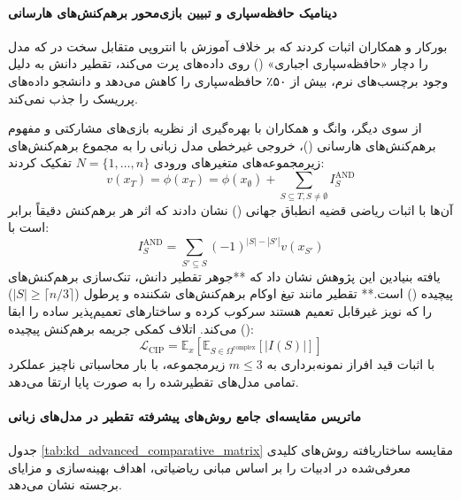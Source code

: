 \paragraph*{دینامیک حافظه‌سپاری و تبیین بازی‌محور برهم‌کنش‌های هارسانی}
بورکار و همکاران \cite{borkar2026memorization} اثبات کردند که بر خلاف آموزش با انتروپی متقابل سخت در  که مدل را دچار «حافظه‌سپاری اجباری» () روی داده‌های پرت می‌کند، تقطیر دانش به دلیل وجود برچسب‌های نرم، بیش از ۵۰٪ حافظه‌سپاری را کاهش می‌دهد و دانشجو داده‌های پرریسک را جذب نمی‌کند.

از سوی دیگر، وانگ و همکاران \cite{wang2026unified} با بهره‌گیری از نظریه بازی‌های مشارکتی و مفهوم برهم‌کنش‌های هارسانی ()، خروجی غیرخطی مدل زبانی را به مجموع برهم‌کنش‌های زیرمجموعه‌های متغیرهای ورودی $N = \{1, \dots, n\}$ تفکیک کردند:
\begin{equation}
    v(x_T) = \phi(x_T) = \phi(x_\emptyset) + \sum_{S \subseteq T, S \neq \emptyset} I_S^{\text{AND}}
\end{equation}
آن‌ها با اثبات ریاضی قضیه انطباق جهانی () نشان دادند که اثر هر برهم‌کنش دقیقاً برابر است با:
\begin{equation}
    I_S^{\text{AND}} = \sum_{S' \subseteq S} (-1)^{|S| - |S'|} v(x_{S'})
\end{equation}
یافته بنیادین این پژوهش نشان داد که **جوهر تقطیر دانش، تنک‌سازی برهم‌کنش‌های پیچیده () است.** تقطیر مانند تیغ اوکام برهم‌کنش‌های شکننده و پرطول ($|S| \ge \lceil n/3 \rceil$) را که نویز غیرقابل تعمیم هستند سرکوب کرده و ساختارهای تعمیم‌پذیر ساده را ابقا می‌کند. اتلاف کمکی جریمه برهم‌کنش پیچیده ():
\begin{equation}
    \mathcal{L}_{\text{CIP}} = \mathbb{E}_x \left[ \mathbb{E}_{S \in \Omega^{\text{complex}}} [|I(S)|] \right]
\end{equation}
با اثبات قید افراز نمونه‌برداری به $m \le 3$ زیرمجموعه، با بار محاسباتی ناچیز عملکرد تمامی مدل‌های تقطیرشده را به صورت پایا ارتقا می‌دهد.

\paragraph*{ماتریس مقایسه‌ای جامع روش‌های پیشرفته تقطیر در مدل‌های زبانی}
جدول \ref{tab:kd_advanced_comparative_matrix} مقایسه ساختاریافته روش‌های کلیدی معرفی‌شده در ادبیات را بر اساس مبانی ریاضیاتی، اهداف بهینه‌سازی و مزایای برجسته نشان می‌دهد.


